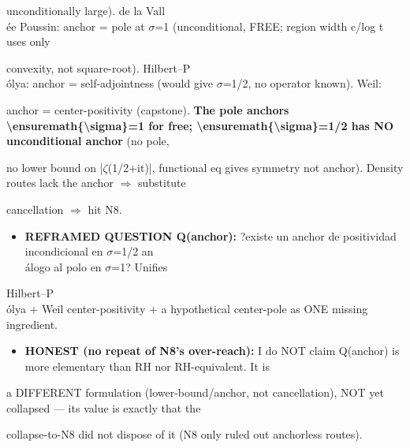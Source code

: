 \documentclass[10pt]{article}
\begin{document}
  unconditionally large). de la Vall\\\'ee Poussin: anchor = pole at \ensuremath{\sigma}=1 (unconditional, FREE; region width c/log t uses only\par
  convexity, not square-root). Hilbert--P\\\'olya: anchor = self-adjointness (would give \ensuremath{\sigma}=1/2, no operator known). Weil:\par
  anchor = center-positivity (capstone). \textbf{The pole anchors \textbackslash{}ensuremath\{\textbackslash{}sigma\}=1 for free; \textbackslash{}ensuremath\{\textbackslash{}sigma\}=1/2 has NO unconditional anchor} (no pole,\par
  no lower bound on |\ensuremath{\zeta}(1/2+it)|, functional eq gives symmetry not anchor). Density routes lack the anchor \ensuremath{\Rightarrow} substitute\par
  cancellation \ensuremath{\Rightarrow} hit N8.\par
\begin{itemize}
\item \textbf{REFRAMED QUESTION Q(anchor):} ?existe un anchor de positividad incondicional en \ensuremath{\sigma}=1/2 an\\\'alogo al polo en \ensuremath{\sigma}=1? Unifies
\end{itemize}
  Hilbert--P\\\'olya + Weil center-positivity + a hypothetical center-pole as ONE missing ingredient.\par
\begin{itemize}
\item \textbf{HONEST (no repeat of N8's over-reach):} I do NOT claim Q(anchor) is more elementary than RH nor RH-equivalent. It is
\end{itemize}
  a DIFFERENT formulation (lower-bound/anchor, not cancellation), NOT yet collapsed --- its value is exactly that the\par
  collapse-to-N8 did not dispose of it (N8 only ruled out anchorless routes).\par
\end{document}
